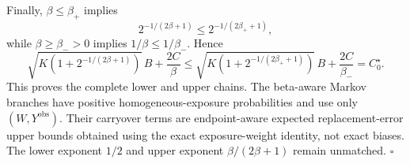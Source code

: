 Finally, \(\beta\le\beta_+\) implies
\[
2^{-1/(2\beta+1)}\le2^{-1/(2\beta_++1)},
\]
while \(\beta\ge\beta_->0\) implies \(1/\beta\le1/\beta_-\). Hence
\[
\sqrt{K\left(1+2^{-1/(2\beta+1)}\right)}\,B+\frac{2C}{\beta}
\le
\sqrt{K\left(1+2^{-1/(2\beta_++1)}\right)}\,B+\frac{2C}{\beta_-}
=C_0^\star.
\]
This proves the complete lower and upper chains. The beta-aware Markov branches have positive homogeneous-exposure probabilities and use only \((W,Y^{\mathrm{obs}})\). Their carryover terms are endpoint-aware expected replacement-error upper bounds obtained using the exact exposure-weight identity, not exact biases. The lower exponent \(1/2\) and upper exponent \(\beta/(2\beta+1)\) remain unmatched. \(\square\)